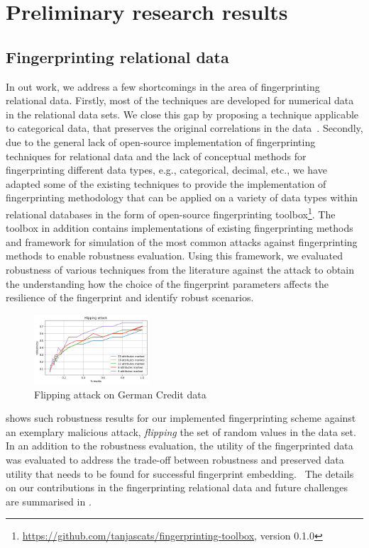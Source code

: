 \documentclass[conference]{IEEEtran}
\begin{document}
\section{Preliminary research results}
\subsection{Fingerprinting relational data}
In out work, we address a few shortcomings in the area of fingerprinting relational data.
Firstly, most of the techniques are developed for numerical data in the relational data sets. 
We close this gap by proposing a technique applicable to categorical data, that preserves the original correlations in the data~\cite{sarcevic2020correlation}. 
Secondly, due to the general lack of open-source implementation of fingerprinting techniques for relational data and the lack of conceptual methods for fingerprinting different data types, e.g., categorical, decimal, etc., we have adapted some of the existing techniques to provide the implementation of fingerprinting methodology that can be applied on a variety of data types within relational databases in the form of open-source fingerprinting toolbox\footnote{\url{https://github.com/tanjascats/fingerprinting-toolbox}, version 0.1.0}.  
The toolbox in addition contains implementations of existing fingerprinting methods and framework for simulation of the most common attacks against fingerprinting methods to enable robustness evaluation. 
Using this framework, we evaluated robustness of various techniques from the literature against the attack to obtain the understanding how the choice of the fingerprint parameters affects the resilience of the fingerprint and identify robust scenarios.
\begin{figure}
    \centering
    \includegraphics[width=0.38\textwidth]{figures/flipping-german.png}
    \caption[]{Flipping attack on German Credit data\footnotemark}
    \label{fig:robustness}
\end{figure}
 shows such robustness results for our implemented fingerprinting scheme against an exemplary malicious attack, \textit{flipping} the set of random values in the data set.
In an addition to the robustness evaluation, the utility of the fingerprinted data was evaluated to address the trade-off between robustness and preserved data utility that needs to be found for successful fingerprint embedding.~\cite{sarcevic2019evaluation}
The details on our contributions in the fingerprinting relational data and future challenges are summarised in \cite{sarcevic2021fingerprinting}.
\end{document}
